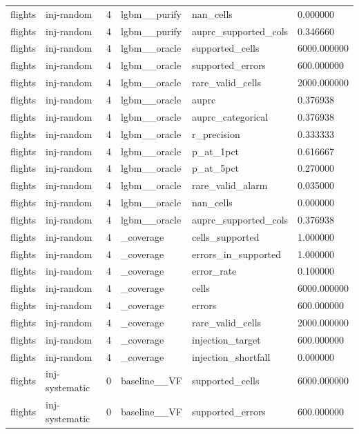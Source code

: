 \begin{tabular}{llllll}
flights & inj-random & 4 & lgbm\_\_purify & nan\_cells & 0.000000 \\
flights & inj-random & 4 & lgbm\_\_purify & auprc\_supported\_cols & 0.346660 \\
flights & inj-random & 4 & lgbm\_\_oracle & supported\_cells & 6000.000000 \\
flights & inj-random & 4 & lgbm\_\_oracle & supported\_errors & 600.000000 \\
flights & inj-random & 4 & lgbm\_\_oracle & rare\_valid\_cells & 2000.000000 \\
flights & inj-random & 4 & lgbm\_\_oracle & auprc & 0.376938 \\
flights & inj-random & 4 & lgbm\_\_oracle & auprc\_categorical & 0.376938 \\
flights & inj-random & 4 & lgbm\_\_oracle & r\_precision & 0.333333 \\
flights & inj-random & 4 & lgbm\_\_oracle & p\_at\_1pct & 0.616667 \\
flights & inj-random & 4 & lgbm\_\_oracle & p\_at\_5pct & 0.270000 \\
flights & inj-random & 4 & lgbm\_\_oracle & rare\_valid\_alarm & 0.035000 \\
flights & inj-random & 4 & lgbm\_\_oracle & nan\_cells & 0.000000 \\
flights & inj-random & 4 & lgbm\_\_oracle & auprc\_supported\_cols & 0.376938 \\
flights & inj-random & 4 & \_coverage & cells\_supported & 1.000000 \\
flights & inj-random & 4 & \_coverage & errors\_in\_supported & 1.000000 \\
flights & inj-random & 4 & \_coverage & error\_rate & 0.100000 \\
flights & inj-random & 4 & \_coverage & cells & 6000.000000 \\
flights & inj-random & 4 & \_coverage & errors & 600.000000 \\
flights & inj-random & 4 & \_coverage & rare\_valid\_cells & 2000.000000 \\
flights & inj-random & 4 & \_coverage & injection\_target & 600.000000 \\
flights & inj-random & 4 & \_coverage & injection\_shortfall & 0.000000 \\
flights & inj-systematic & 0 & baseline\_\_VF & supported\_cells & 6000.000000 \\
flights & inj-systematic & 0 & baseline\_\_VF & supported\_errors & 600.000000 \\

\end{tabular}
